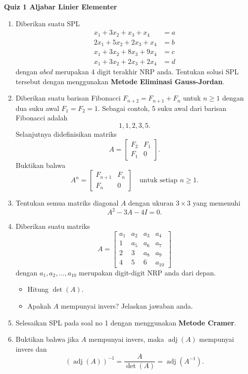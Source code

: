 \documentclass[10pt]{article}
\begin{document}
\begin{center}
    \Large\textbf{Quiz 1 Aljabar Linier Elementer}
\end{center}
\vspace{0.5cm}

\begin{enumerate}
    \item Diberikan suatu SPL
    \begin{align*}
        x_1 + 3x_2 + x_3 + x_4 &= a \\
        2x_1 + 5x_2 + 2x_3 + x_4 &= b \\
        x_1 + 3x_2 + 8x_3 + 9x_4 &= c \\
        x_1 + 3x_2 + 2x_3 + 2x_4 &= d
    \end{align*}
    dengan $abcd$ merupakan 4 digit terakhir NRP anda. Tentukan solusi SPL tersebut dengan menggunakan \textbf{Metode Eliminasi Gauss-Jordan}.
    
    \item Diberikan suatu barisan Fibonacci $F_{n+2} = F_{n+1} + F_n$ untuk $n \geq 1$ dengan dua suku awal $F_1 = F_2 = 1$. Sebagai contoh, 5 suku awal dari barisan Fibonacci adalah
    \[
    1, 1, 2, 3, 5.
    \]
    Selanjutnya didefinisikan matriks
    \[
    A = \begin{bmatrix}
    F_2 & F_1 \\
    F_1 & 0
    \end{bmatrix}.
    \]
    Buktikan bahwa
    \[
    A^n = \begin{bmatrix}
    F_{n+1} & F_n \\
    F_n & 0
    \end{bmatrix}
    \quad \text{untuk setiap } n \geq 1.
    \]

    \item Tentukan semua matriks diagonal $A$ dengan ukuran $3 \times 3$ yang memenuhi
    \[
    A^2 - 3A - 4I = 0.
    \]

    \item Diberikan suatu matriks
    \[
    A = \begin{bmatrix}
    a_1 & a_2 & a_3 & a_4 \\
    1 & a_5 & a_6 & a_7 \\
    2 & 3 & a_8 & a_9 \\
    4 & 5 & 6 & a_{10}
    \end{bmatrix}
    \]
    dengan $a_1, a_2, \ldots, a_{10}$ merupakan digit-digit NRP anda dari depan.
    \begin{itemize}
        \item Hitung $\det(A)$.
        \item Apakah $A$ mempunyai invers? Jelaskan jawaban anda.
    \end{itemize}

    \item Selesaikan SPL pada soal no 1 dengan menggunakan \textbf{Metode Cramer}.

    \item Buktikan bahwa jika $A$ mempunyai invers, maka $\operatorname{adj}(A)$ mempunyai invers dan
    \[
    (\operatorname{adj}(A))^{-1} = \frac{A}{\det(A)} = \operatorname{adj}(A^{-1}).
    \]
\end{enumerate}
\end{document}
